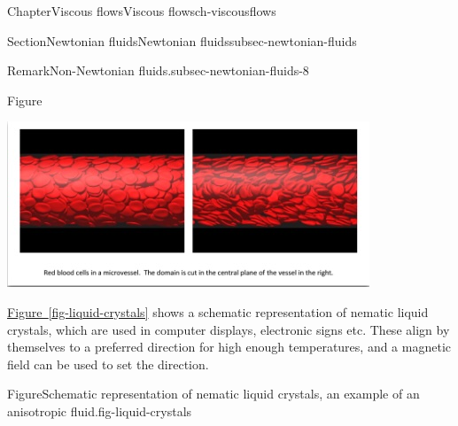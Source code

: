 \documentclass[oneside,10pt,]{book}
\newcommand{\xreffont}{\relax}
\numberwithin{equation}{section}
\begin{document}
\begin{chapterptx}{Chapter}{Viscous flows}{}{Viscous flows}{}{}{ch-viscousflows}
\begin{sectionptx}{Section}{Newtonian fluids}{}{Newtonian fluids}{}{}{subsec-newtonian-fluids}
\begin{remark}{Remark}{Non-Newtonian fluids.}{subsec-newtonian-fluids-8}
\begin{itemize}[label=\textbullet]
\begin{figureptx}{Figure}
\begin{image}{0.05}{0.9}{0.05}{}%
\includegraphics[width=\linewidth]{external/ch-chapter07-artery.jpg}
\end{image}%
\tcblower
\end{figureptx}%
\hyperref[fig-liquid-crystals]{Figure~{\xreffont\ref{fig-liquid-crystals}}} shows a schematic representation of nematic liquid crystals, which are used in computer displays, electronic signs etc. These align by themselves to a preferred direction for high enough temperatures, and a magnetic field can be used to set the direction.%
\begin{figureptx}{Figure}{Schematic representation of nematic liquid crystals, an example of an anisotropic fluid.}{fig-liquid-crystals}{}%
\begin{image}{0.35}{0.3}{0.35}{}%

\end{image}
\end{figureptx}
\end{itemize}
\end{remark}
\end{sectionptx}
\end{chapterptx}
\end{document}
